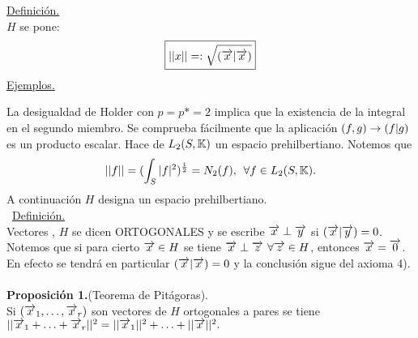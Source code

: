 \underline{Definición.}\\
\todo \xraya \en $H$ se pone: 
\begin{equation*}
\boxed{|| x || =: \sqrt{(\overrightarrow{x} | \overrightarrow{x})}}
\end{equation*}
\underline{Ejemplos.}\\
La desigualdad de Holder con $p=p*=2$ implica que la existencia de la integral en el segundo miembro. Se comprueba fácilmente que la aplicación $(f,g) \rightarrow (f|g)$ es un producto escalar. Hace de $L_2 (S,\mathbb{K})$ un espacio prehilbertiano. Notemos que 
$$
||f||=(\int_S |f|^2)^\frac{1}{2}=N_2(f), \phantom{s} \forall f \in L_2(S,\mathbb{K}).
$$
A continuación $H$ designa un espacio prehilbertiano. \\\
\underline{Definición.}\\
Vectores \xraya , \yraya \en $H$ se dicen ORTOGONALES y se escribe $\overrightarrow{x}\perp \overrightarrow{y}$ si $(\overrightarrow{x} | \overrightarrow{y} )=0$.\\
Notemos que si para cierto $\overrightarrow{x} \in H$ se tiene $\overrightarrow{x} \perp \overrightarrow{z}$ $\forall  \overrightarrow{z} \in H$, entonces $\overrightarrow{x}=\overrightarrow{0}$. En efecto se tendrá en particular $(\overrightarrow{x} | \overrightarrow{x})=0$ y la conclusión sigue del axioma 4).\\ \\
\textbf{Proposición 1.}(Teorema de Pitágoras).\\
Si $(\overrightarrow{x}_1,\ldots ,\overrightarrow{x}_r)$ son vectores de $H$ ortogonales a pares se tiene $|| \overrightarrow{x}_1+ \ldots + \overrightarrow{x}_r ||^2= ||\overrightarrow{x}_1 ||^2+ \ldots + || \overrightarrow{x} ||^2.$

